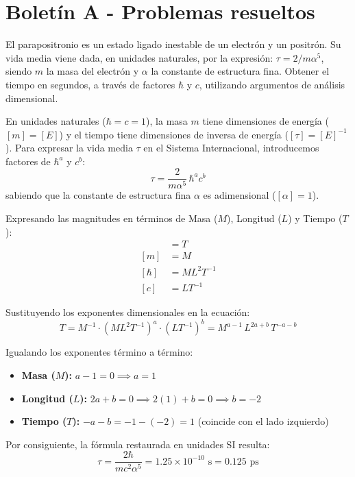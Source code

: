\chapter*{Boletín A - Problemas resueltos}
\setcounter{chapter}{1}
\setcounter{problemacontador}{0}



\begin{problema}
El parapositronio es un estado ligado inestable de un electrón y un positrón. Su vida media viene dada, en unidades naturales, por la expresión: $\tau = 2/m\alpha^5$, siendo $m$ la masa del electrón y $\alpha$ la constante de estructura fina. Obtener el tiempo en segundos, a través de factores $\hbar$ y $c$, utilizando argumentos de análisis dimensional.

\tcblower

En unidades naturales ($\hbar = c = 1$), la masa $m$ tiene dimensiones de energía ($[m] = [E]$) y el tiempo tiene dimensiones de inversa de energía ($[\tau] = [E]^{-1}$). Para expresar la vida media $\tau$ en el Sistema Internacional, introducemos factores de $\hbar^a$ y $c^b$:
\[
\tau = \frac{2}{m \alpha^5} \, \hbar^a c^b
\]
sabiendo que la constante de estructura fina $\alpha$ es adimensional ($[\alpha] = 1$).

Expresando las magnitudes en términos de Masa ($M$), Longitud ($L$) y Tiempo ($T$):
\begin{align*}
[\tau] &= T \\
[m] &= M \\
[\hbar] &= M L^2 T^{-1} \\
[c] &= L T^{-1}
\end{align*}

Sustituyendo los exponentes dimensionales en la ecuación:
\[
T = M^{-1} \cdot (M L^2 T^{-1})^a \cdot (L T^{-1})^b = M^{a-1} \, L^{2a+b} \, T^{-a-b}
\]

Igualando los exponentes término a término:
\begin{itemize}
    \item \textbf{Masa ($M$):} $a - 1 = 0 \implies a = 1$
    \item \textbf{Longitud ($L$):} $2a + b = 0 \implies 2(1) + b = 0 \implies b = -2$
    \item \textbf{Tiempo ($T$):} $-a - b = -1 - (-2) = 1$ \quad (coincide con el lado izquierdo)
\end{itemize}

Por consiguiente, la fórmula restaurada en unidades SI resulta:
\[
\tau = \frac{2\hbar}{m c^2 \alpha^5} = 1.25 \times 10^{-10} \text{ s} = 0.125 \text{ ps}
\]
\end{problema}

